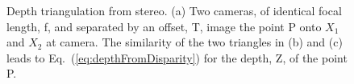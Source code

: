 \begin{figure}
\centerline{
}
\centerline{
}
\caption{Depth triangulation from stereo. (a) Two cameras, of identical focal length, f, and separated by an offset, T, image the point P onto $X_1$ and $X_2$ at camera.  The similarity of the two triangles in (b) and (c) leads to Eq.~(\ref{eq:depthFromDisparity}) for the depth, Z, of the point P.}
\label{fig:stereo}
\end{figure}


